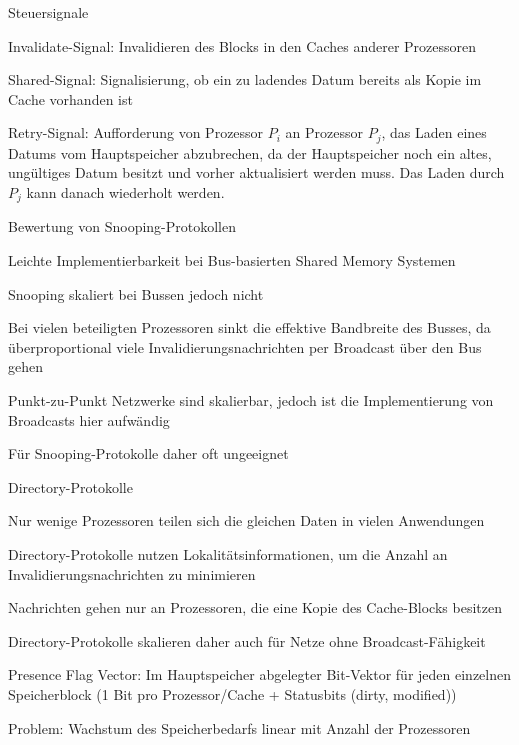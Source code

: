 \documentclass[10pt,landscape]{article}
\begin{document}
\begin{multicols}{3}
\begin{itemize*}
  \end{itemize*}
  Steuersignale
  \begin{itemize*}
    \item Invalidate-Signal: Invalidieren des Blocks in den Caches anderer Prozessoren
    \item Shared-Signal: Signalisierung, ob ein zu ladendes Datum bereits als Kopie im Cache vorhanden ist
    \item Retry-Signal: Aufforderung von Prozessor $P_i$ an Prozessor $P_j$, das Laden eines Datums vom Hauptspeicher abzubrechen, da der Hauptspeicher noch ein altes, ungültiges Datum besitzt und vorher aktualisiert werden muss. Das Laden durch $P_j$ kann danach wiederholt werden.
  \end{itemize*}
  Bewertung von Snooping-Protokollen
  \begin{itemize*}
    \item Leichte Implementierbarkeit bei Bus-basierten Shared Memory Systemen
    \item Snooping skaliert bei Bussen jedoch nicht
    \item Bei vielen beteiligten Prozessoren sinkt die effektive Bandbreite des Busses, da überproportional viele Invalidierungsnachrichten per Broadcast über den Bus gehen
    \item Punkt-zu-Punkt Netzwerke sind skalierbar, jedoch ist die Implementierung von Broadcasts hier aufwändig
    \item Für Snooping-Protokolle daher oft ungeeignet
  \end{itemize*}
  
  Directory-Protokolle
  \begin{itemize*}
    \item Nur wenige Prozessoren teilen sich die gleichen Daten in vielen Anwendungen
    \item Directory-Protokolle nutzen Lokalitätsinformationen, um die Anzahl an Invalidierungsnachrichten zu minimieren
    \item Nachrichten gehen nur an Prozessoren, die eine Kopie des Cache-Blocks besitzen
    \item Directory-Protokolle skalieren daher auch für Netze ohne Broadcast-Fähigkeit
    \item Presence Flag Vector: Im Hauptspeicher abgelegter Bit-Vektor für jeden einzelnen Speicherblock (1 Bit pro Prozessor/Cache + Statusbits (dirty, modified))
    \item Problem: Wachstum des Speicherbedarfs linear mit Anzahl der Prozessoren
  \end{itemize*}
  

\end{multicols}
\end{document}

